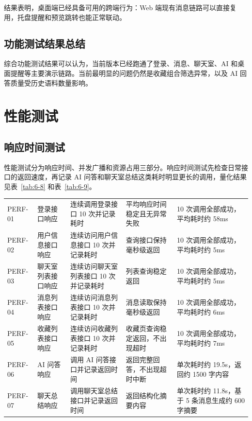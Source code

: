 结果表明，桌面端已经具备可用的跨端行为：Web 端现有消息链路可以直接复用，托盘提醒和预览跳转也能正常联动。

\subsection{功能测试结果总结}

综合功能测试结果可以认为，当前版本已经跑通了登录、消息、聊天室、AI 和桌面提醒等主要演示链路。当前最明显的问题仍然是收藏组合筛选异常，以及 AI 回答质量受历史语料数量影响。

\section{性能测试}

\subsection{响应时间测试}

性能测试分为响应时间、并发广播和资源占用三部分。响应时间测试先检查日常接口的返回速度，再记录 AI 问答和聊天室总结这类耗时明显更长的调用，量化结果见表~\ref{tab:6-8} 和表~\ref{tab:6-9}。

\renewcommand{\arraystretch}{1.08}
\setlength{\tabcolsep}{0.55ex}
\small
\begin{longtable}{M{0.12\textwidth}p{0.16\textwidth}p{0.18\textwidth}p{0.18\textwidth}p{0.23\textwidth}}
PERF-01 & 登录接口响应 & 连续调用登录接口 10 次并记录耗时 & 平均响应时间稳定且无异常失败 & 10 次调用全部成功，平均耗时约 58ms \\
PERF-02 & 用户信息接口响应 & 连续访问用户信息接口 10 次并记录耗时 & 查询接口保持毫秒级返回 & 10 次调用全部成功，平均耗时约 5ms \\
PERF-03 & 聊天室列表接口响应 & 连续访问聊天室列表接口 10 次并记录耗时 & 列表查询稳定返回 & 10 次调用全部成功，平均耗时约 5ms \\
PERF-04 & 消息列表接口响应 & 连续访问消息列表接口 10 次并记录耗时 & 消息读取保持毫秒级返回 & 10 次调用全部成功，平均耗时约 6ms \\
PERF-05 & 收藏列表接口响应 & 连续访问收藏列表接口 10 次并记录耗时 & 收藏页查询稳定返回，不出现超时 & 10 次调用全部成功，平均耗时约 7ms \\
PERF-06 & AI 问答响应 & 调用 AI 问答接口并记录返回时间 & 返回完整回答，不出现超时中断 & 单次耗时约 19.5s，返回约 1500 字内容 \\
PERF-07 & 聊天总结响应 & 调用聊天室总结接口并记录返回时间 & 返回结构化摘要内容 & 单次耗时约 11.8s，基于 5 条消息生成约 600 字摘要 \\
\end{longtable}
\normalsize

